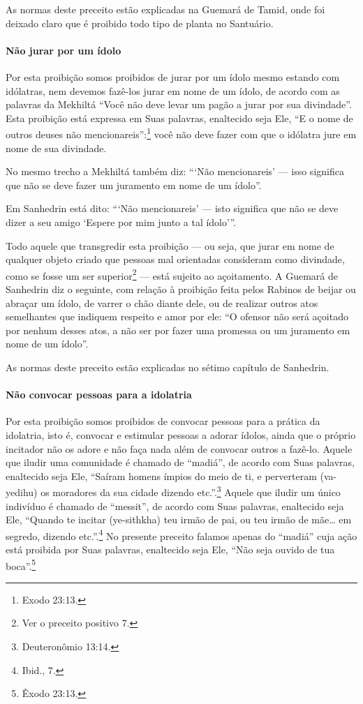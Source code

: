 As normas deste preceito estão explicadas na Guemará de Tamid, onde foi
deixado claro que é proibido todo tipo de planta no Santuário.

\paragraph{Não jurar por um ídolo}

Por esta proibição somos proibidos de jurar por um ídolo mesmo estando
com idólatras, nem devemos fazê-los jurar em nome de um ídolo, de acordo
com as palavras da Mekhiltá ``Você não deve levar um pagão a jurar por
sua divindade''. Esta proibição está expressa em Suas palavras,
enaltecido seja Ele, ``E o nome de outros deuses não mencionareis'':\footnote{Exodo 23:13.} você não deve fazer com que o idólatra jure em nome de
sua divindade.

No mesmo trecho a Mekhiltá também diz: ```Não mencionareis' --- isso
significa que não se deve fazer um juramento em nome de um ídolo''.

Em Sanhedrin está dito: ```Não mencionareis' --- isto significa que não
se deve dizer a seu amigo `Espere por mim junto a tal ídolo'''.

Todo aquele que transgredir esta proibição --- ou seja, que jurar em
nome de qualquer objeto criado que pessoas mal orientadas consideram
como divindade, como se fosse um ser superior\footnote{Ver o preceito positivo 7.} ---
está sujeito ao açoitamento. A Guemará de Sanhedrin diz o seguinte, com
relação à proibição feita pelos Rabinos de beijar ou abraçar um ídolo,
de varrer o chão diante dele, ou de realizar outros atos semelhantes que
indiquem respeito e amor por ele: ``O ofensor não será açoitado por
nenhum desses atos, a não ser por fazer uma promessa ou um juramento em
nome de um ídolo''.

As normas deste preceito estão explicadas no sétimo capítulo de Sanhedrin.

\paragraph{Não convocar pessoas para a idolatria}

Por esta proibição somos proibidos de convocar pessoas para a prática
da idolatria, isto é, convocar e estimular pessoas a adorar ídolos,
ainda que o próprio incitador não os adore e não faça nada além de
convocar outros a fazê-lo. Aquele que iludir uma comunidade é chamado de
``madiá'', de acordo com Suas palavras, enaltecido seja Ele, ``Saíram
homens ímpios do meio de ti, e perverteram (va-yedihu) os moradores da
sua cidade dizendo etc.''.\footnote{Deuteronômio 13:14.} Aquele que iludir um
único indivíduo é chamado de ``messit'', de acordo com Suas palavras,
enaltecido seja Ele, ``Quando te incitar (ye-sithkha) teu irmão de pai,
ou teu irmão de mãe\ldots{} em segredo, dizendo etc.''.\footnote{Ibid., 7.} No
presente preceito falamos apenas do ``madiá'' cuja ação está proibida
por Suas palavras, enaltecido seja Ele, ``Não seja ouvido de tua boca''.\footnote{Êxodo 23:13.}

